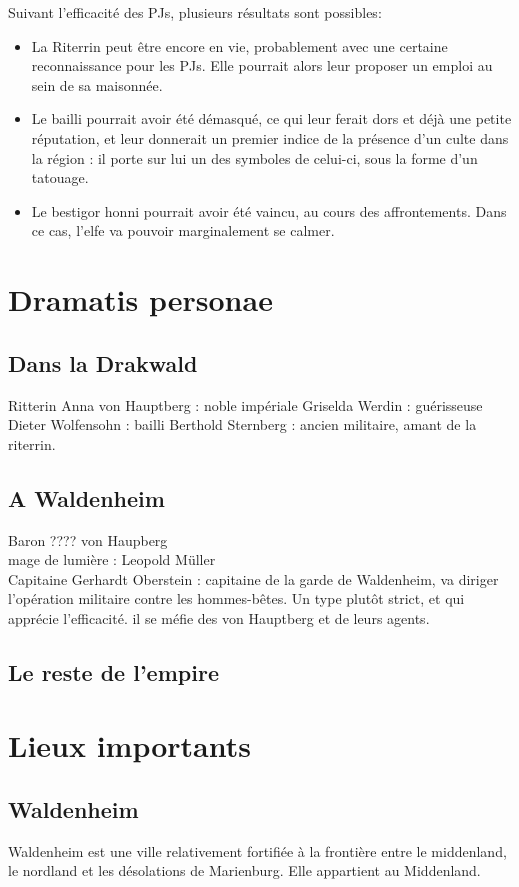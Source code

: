 \documentclass[10pt,a4paper]{book}
\begin{document}
Suivant l'efficacité des PJs, plusieurs résultats sont possibles:
\begin{itemize}
\item La Riterrin peut être encore en vie, probablement avec une certaine reconnaissance pour les PJs. Elle pourrait alors leur proposer un emploi au sein de sa maisonnée.
\item Le bailli pourrait avoir été démasqué, ce qui leur ferait dors et déjà une petite réputation, et leur donnerait un premier indice de la présence d'un culte dans la région : il porte sur lui un des symboles de celui-ci, sous la forme d'un tatouage.
\item Le bestigor honni pourrait avoir été vaincu, au cours des affrontements. Dans ce cas, l'elfe va pouvoir marginalement se calmer.
\end{itemize}
\chapter{Dramatis personae}
\section{Dans la Drakwald}
Ritterin Anna von Hauptberg : noble impériale
Griselda Werdin : guérisseuse
Dieter Wolfensohn : bailli
Berthold Sternberg : ancien militaire, amant de la riterrin.
\section{A Waldenheim}
Baron ???? von Haupberg\\
mage de lumière : Leopold Müller\\
Capitaine Gerhardt Oberstein : capitaine de la garde de Waldenheim, va diriger l'opération militaire contre les hommes-bêtes. Un type plutôt strict, et qui apprécie l'efficacité. il se méfie des von Hauptberg et de leurs agents.
\section{Le reste de l'empire}

\chapter{Lieux importants}
\section{Waldenheim}
Waldenheim est une ville relativement fortifiée à la frontière entre le middenland, le nordland et les désolations de Marienburg. Elle appartient au Middenland.
\end{document}
